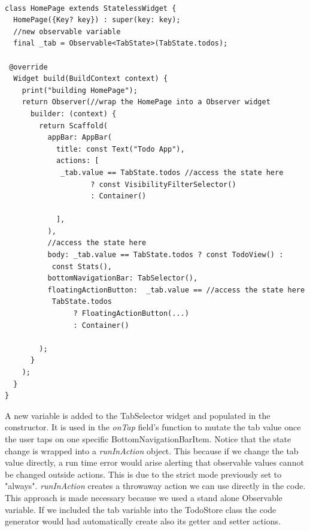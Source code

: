 \begin{code}
\mbox{}\\
 \mbox{}
		\label{code:2.14}
\begin{verbatim}
class HomePage extends StatelessWidget {
  HomePage({Key? key}) : super(key: key); 
  //new observable variable
  final _tab = Observable<TabState>(TabState.todos);

 @override
  Widget build(BuildContext context) {
    print("building HomePage");
    return Observer(//wrap the HomePage into a Observer widget
      builder: (context) {
        return Scaffold(
          appBar: AppBar(
            title: const Text("Todo App"),
            actions: [
             _tab.value == TabState.todos //access the state here
                    ? const VisibilityFilterSelector()
                    : Container()

            ],
          ),
          //access the state here
          body: _tab.value == TabState.todos ? const TodoView() :
           const Stats(),
          bottomNavigationBar: TabSelector(),
          floatingActionButton:  _tab.value == //access the state here
           TabState.todos
                ? FloatingActionButton(...)
                : Container()

        );
      }
    );
  }
}
\end{verbatim}
\mbox{}
\end{code}

A new variable is added to the TabSelector widget and populated in the constructor. It is used in the \textit{onTap} field’s function to mutate the tab value once the user taps on one specific BottomNavigationBarItem. Notice that the state change is wrapped into a \textit{runInAction} object. This because if we change the tab value directly, a run time error would arise alerting that observable values cannot be changed outside actions. This is due to the strict mode previously set to "always". \textit{runInAction} creates a throwaway action we can use directly in the code. This approach is made necessary because we used a stand alone Observable variable. If we included the tab variable into the TodoStore class the code generator would had automatically create also its getter and setter actions.


